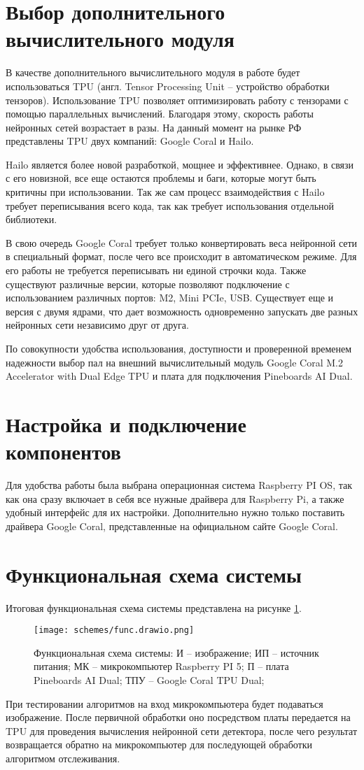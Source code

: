 \section{Выбор дополнительного вычислительного модуля}
В качестве дополнительного вычислительного модуля в работе будет использоваться TPU (англ. Tensor Processing Unit -- устройство обработки тензоров). Использование TPU позволяет оптимизировать работу с тензорами с помощью параллельных вычислений.
Благодаря этому, скорость работы нейронных сетей возрастает в разы. На данный момент на рынке РФ представлены TPU двух компаний: Google Coral и Hailo. 

Hailo является более новой разработкой, мощнее и эффективнее. Однако, в связи с его новизной, все еще остаются проблемы и баги, которые могут быть критичны при использовании. Так же сам процесс взаимодействия с Hailo требует переписывания всего кода, так как требует использования отдельной библиотеки. 

В свою очередь Google Coral требует только конвертировать веса нейронной сети в специальный формат, после чего все происходит в автоматическом режиме. Для его работы не требуется переписывать ни единой строчки кода. 
Также существуют различные версии, которые позволяют подключение с использованием различных портов: M2, Mini PCIe, USB. 
Существует еще и версия с двумя ядрами, что дает возможность одновременно запускать две разных нейронных сети независимо друг от друга. 

По совокупности удобства использования, доступности и проверенной временем надежности выбор пал на внешний вычислительный модуль Google Coral M.2 Accelerator with Dual Edge TPU и плата для подключения Pineboards AI Dual. 

\section{Настройка и подключение компонентов}
Для удобства работы была выбрана операционная система Raspberry PI OS, так как она сразу включает в себя все нужные драйвера для Raspberry Pi, а также удобный интерфейс для их настройки. 
Дополнительно нужно только поставить драйвера Google Coral, представленные на официальном сайте Google Coral. 

\section{Функциональная схема системы}

Итоговая функциональная схема системы представлена на рисунке \ref{fig:func_scheme}. 
\begin{figure}[ht]
  \centering
  \texttt{[image: schemes/func.drawio.png]}
  \caption{Функциональная схема системы: И -- изображение; ИП -- источник питания; МК -- микрокомпьютер Raspberry PI 5; П -- плата Pineboards AI Dual; ТПУ -- Google Coral TPU Dual;}
  \label{fig:func_scheme}
\end{figure}
При тестировании алгоритмов на вход микрокомпьютера будет подаваться изображение. После первичной обработки оно посредством платы передается на TPU для проведения вычисления нейронной сети детектора, после чего результат возвращается обратно на микрокомпьютер для последующей обработки алгоритмом отслеживания.
